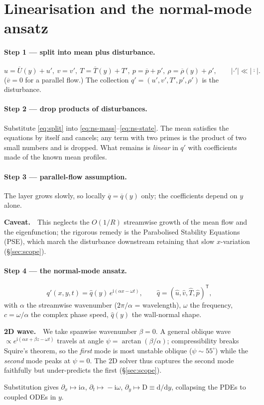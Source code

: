 \documentclass[11pt]{article}
\newcommand{\remark}[2]{%
  \par\smallskip\noindent\colorbox{rmkbg}{%
  \parbox{0.965\linewidth}{\smallskip\footnotesize\textbf{#1}\ \ #2\smallskip}}\par\smallskip}
\newcommand{\D}{\mathrm{D}}
\newcommand{\imag}{\mathrm{i}}
\renewcommand{\bar}[1]{\overline{#1}}
\newcommand{\hatu}{\hat{u}}
\newcommand{\hatv}{\hat{v}}
\newcommand{\hatT}{\hat{T}}
\newcommand{\hatp}{\hat{p}}
\newcommand{\hatq}{\hat{q}}
\begin{document}
\section{Linearisation and the normal-mode ansatz}\label{sec:lin}

\paragraph{Step 1 --- split into mean plus disturbance.}
\begin{equation}\label{eq:split}
  u=\bar U(y)+u',\ v=v',\ T=\bar T(y)+T',\ p=\bar p+p',\ \rho=\bar\rho(y)+\rho',\qquad |\cdot'|\ll|\bar\cdot| .
\end{equation}
($\bar v=0$ for a parallel flow.) The collection $q'=(u',v',T',p',\rho')$ is the disturbance.

\paragraph{Step 2 --- drop products of disturbances.} Substitute \eqref{eq:split} into
\eqref{eq:ns-mass}--\eqref{eq:ns-state}. The mean satisfies the equations by itself and cancels; any term
with two primes is the product of two small numbers and is dropped. What remains is \emph{linear} in $q'$
with coefficients made of the known mean profiles.

\paragraph{Step 3 --- parallel-flow assumption.} The layer grows slowly, so locally $\bar q=\bar q(y)$
only; the coefficients depend on $y$ alone. \remark{Caveat.}{This neglects the $O(1/R)$ streamwise growth of
the mean flow and the eigenfunction; the rigorous remedy is the Parabolised Stability Equations (PSE), which
march the disturbance downstream retaining that slow $x$-variation (\S\ref{sec:scope}).}

\paragraph{Step 4 --- the normal-mode ansatz.}
\begin{equation}\label{eq:ansatz}
  q'(x,y,t)=\hatq(y)\,e^{\imag(\alpha x-\omega t)},\qquad \hatq=(\hatu,\hatv,\hatT,\hatp)^{\mathsf T},
\end{equation}
with $\alpha$ the streamwise wavenumber ($2\pi/\alpha$ = wavelength), $\omega$ the frequency, $c=\omega/\alpha$
the complex phase speed, $\hatq(y)$ the wall-normal shape. \remark{2D wave.}{We take spanwise wavenumber
$\beta=0$. A general oblique wave $\propto e^{\imag(\alpha x+\beta z-\omega t)}$ travels at angle
$\psi=\arctan(\beta/\alpha)$; compressibility breaks Squire's theorem, so the \emph{first} mode is most
unstable oblique ($\psi\!\sim\!55^\circ$) while the \emph{second} mode peaks at $\psi=0$. The 2D solver thus
captures the second mode faithfully but under-predicts the first (\S\ref{sec:scope}).} Substitution gives
$\partial_x\!\mapsto\!\imag\alpha$, $\partial_t\!\mapsto\!-\imag\omega$, $\partial_y\!\mapsto\!\D\equiv\mathrm d/\mathrm dy$,
collapsing the PDEs to coupled ODEs in $y$.
\end{document}

